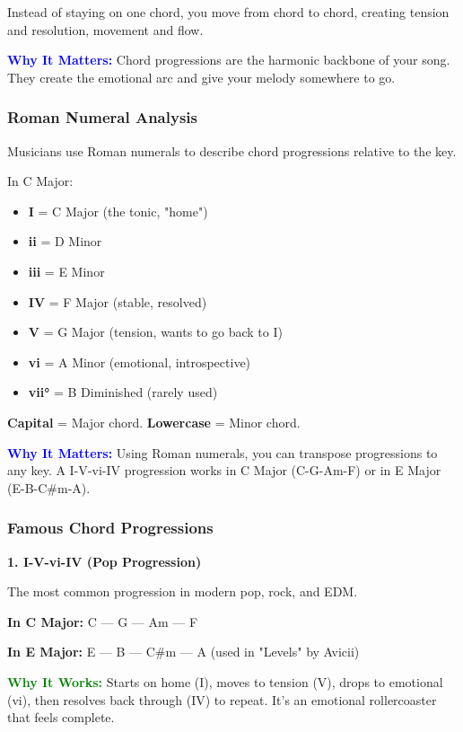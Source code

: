 \documentclass[11pt,letterpaper]{article}
\newcommand{\bluepurple}[1]{\textcolor{blue}{\textbf{#1}}}
\newcommand{\greentext}[1]{\textcolor{green}{\textbf{#1}}}
\begin{document}
Instead of staying on one chord, you move from chord to chord, creating tension and resolution, movement and flow.

\textbf{\bluepurple{Why It Matters:}} Chord progressions are the harmonic backbone of your song. They create the emotional arc and give your melody somewhere to go.

\subsubsection{Roman Numeral Analysis}

Musicians use Roman numerals to describe chord progressions relative to the key.

In C Major:
\begin{itemize}[leftmargin=*]
\item \textbf{I} = C Major (the tonic, "home")
\item \textbf{ii} = D Minor
\item \textbf{iii} = E Minor
\item \textbf{IV} = F Major (stable, resolved)
\item \textbf{V} = G Major (tension, wants to go back to I)
\item \textbf{vi} = A Minor (emotional, introspective)
\item \textbf{vii°} = B Diminished (rarely used)
\end{itemize}

\textbf{Capital} = Major chord. \textbf{Lowercase} = Minor chord.

\textbf{\bluepurple{Why It Matters:}} Using Roman numerals, you can transpose progressions to any key. A I-V-vi-IV progression works in C Major (C-G-Am-F) or in E Major (E-B-C\#m-A).

\subsubsection{Famous Chord Progressions}

\textbf{1. I-V-vi-IV (Pop Progression)}

The most common progression in modern pop, rock, and EDM.

\textbf{In C Major:} C — G — Am — F

\textbf{In E Major:} E — B — C\#m — A (used in "Levels" by Avicii)

\textbf{\greentext{Why It Works:}} Starts on home (I), moves to tension (V), drops to emotional (vi), then resolves back through (IV) to repeat. It's an emotional rollercoaster that feels complete.
\end{document}
